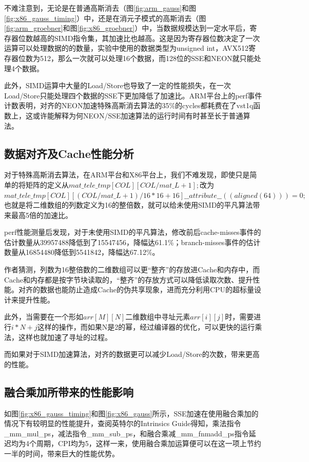 \documentclass[a4paper]{article}
\begin{document}
不难注意到，无论是在普通高斯消去（图\ref{fig:arm_gauss}和图\ref{fig:x86_gauss_timing}）中，还是在消元子模式的高斯消去（图\ref{fig:arm_groebner}和图\ref{fig:x86_groebner}）中，当数据规模达到一定水平后，寄存器位数越高的SIMD指令集，其加速比也越高。这是因为寄存器位数决定了一次运算可以处理数据的的数量，实验中使用的数据类型为unsigned int，AVX512寄存器位数为512，那么一次就可以处理16个数据，而128位的SSE和NEON就只能处理4个数据。

此外，SIMD运算中大量的Load/Store也导致了一定的性能损失，在一次Load/Store只能处理四个数据的SSE下更加降低了加速比。ARM平台上的perf事件计数表明，对齐的NEON加速特殊高斯消去算法的35\%的cycles都耗费在了vst1q函数上，这或许能解释为何NEON/SSE加速算法的运行时间有时甚至长于普通算法。

\subsection{数据对齐及Cache性能分析}

对于特殊高斯消去算法，在ARM平台和X86平台上，我们不难发现，即使只是简单的将矩阵的定义从$mat\_t ele\_tmp[COL][COL / mat\_L + 1];$改为$mat\_t ele\_tmp[COL][(COL / mat\_L + 1) / 16 * 16 + 16] \_\_attribute\_\_((aligned(64))) = {0};$也就是将二维数组的列数定义为16的整倍数，就可以给未使用SIMD的平凡算法带来最高5倍的加速比。

perf性能测量后发现，对于未使用SIMD的平凡算法，修改前后cache-misses事件的估计数量从39957488降低到了15547456，降幅达61.1\%；branch-misses事件的估计数量从16854480降低到5541842，降幅达67.12\%。

作者猜测，列数为16整倍数的二维数组可以更“整齐”的存放进Cache和内存中，而Cache和内存都是按字节块读取的，“整齐”的存放方式可以降低读取次数、提升性能。对齐的数据也能防止造成Cache的伪共享现象，进而充分利用CPU的超标量设计来提升性能。

此外，当需要在一个形如$arr[M][N]$二维数组中寻址元素$arr[i][j]$时，需要进行$i*N+j$这样的操作，而如果N是2的幂，经过编译器的优化，可以更快的运行乘法，这样也就加速了寻址的过程。

而如果对于SIMD加速算法，对齐的数据更可以减少Load/Store的次数，带来更高的性能。

\subsection{融合乘加所带来的性能影响}

如图\ref{fig:x86_gauss_timing}和图\ref{fig:x86_gauss}所示，SSE加速在使用融合乘加的情况下有较明显的性能提升，查阅英特尔的Intrinsics Guide\cite{intelintrinsicsguide}得知，乘法指令\_mm\_mul\_ps，减法指令\_mm\_sub\_ps，和融合乘减\_mm\_fnmadd\_ps指令延迟均为4个周期，CPI均为5，这样一来，使用融合乘加运算便可以在这一项上节约一半的时间，带来巨大的性能优势。

\newpage

 
\end{document}
